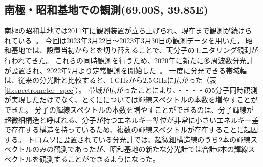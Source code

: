 \subsection{南極・昭和基地での観測(69.00\textdegree S, 39.85\textdegree E)}
\label{subsec:mm_syowa}
南極の昭和基地では2011年に観測装置が立ち上げられ、現在まで観測が続けられている~\cite{isono2014variations,isono2014ground}。
今回は2023年3月22日〜2023年3月30日の観測データを用いた。
昭和基地では、設置当初からとを切り替えることで、両分子のモニタリング観測が行われてきた。
これらの同時観測を行うため、2020年に新たに多周波数分光計が設置され、2022年7月より定常観測を開始した~\cite{iwata2019master,kosegaki2020master}。
一度に分光できる帯域幅は、従来の分光計と比較すると、$1\, \mathrm{GHz}$から$2.5\, \mathrm{GHz}$に広がった（表\ref{tb:spectrometer_spec}）。
帯域が広がったことにより、・・・・の5分子同時観測が実現しただけでなく、とくにについては輝線スペクトルの本数を増やすことができた。
分子の輝線スペクトルの本数を増やすことができるのは、分子輝線が超微細構造と呼ばれる、分子が持つエネルギー準位が非常に小さいエネルギー差で存在する構造を持っているため、複数の輝線スペクトルが存在することに起因する。
トロムソに設置されている分光計では、超微細構造線のうち2本の輝線スペクトルのみの観測であったが、昭和基地の新たな分光計では合計6本の輝線スペクトルを観測することができるようになった。\par

